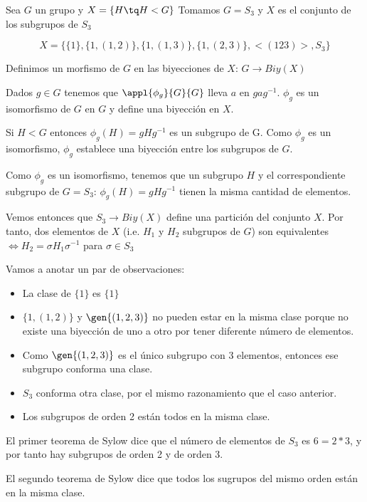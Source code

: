 \documentclass[nochap]{apuntes}
\begin{document}
 \begin{example}
Sea $G$ un grupo y $X = \{ H\tq H<G\} $
Tomamos $G = S_3$ y $X$ es el conjunto de los subgrupos de $S_3$

\[ X = \{ \{1 \}, \{1, (1,2) \}, \{1, (1,3) \}, \{1, (2,3) \}, <(123)>, S_3 \} \]

Definimos un morfismo de $G$ en las biyecciones de $X$: $G\longrightarrow Biy(X)$

Dados $g\in G$ tenemos que $\appl{\phi_g}{G}{G}$ lleva $a$ en $gag^{-1}$. $\phi _g$ es un isomorfismo de $G$ en $G$ y define una biyección en $X$.

Si $H<G$ entonces $\phi _g(H) = gHg^{-1}$ es un subgrupo de G. Como $\phi_g$ es un isomorfismo, $\phi_g$ establece una biyección entre los subgrupos de $G$.

Como $\phi _g$ es un isomorfismo, tenemos que un subgrupo $H$ y el correspondiente subgrupo de $G=S_3$: $\phi _g(H) = gHg^{-1}$ tienen la misma cantidad de elementos.

Vemos entonces que $S_3 \longrightarrow Biy(X)$ define una partición del conjunto $X$.
Por tanto, dos elementos de $X$ (i.e. $H_1$ y $H_2$ subgrupos de $G$) son equivalentes $\iff H_2 = \sigma H_1 \sigma^{-1}$ para $\sigma \in S_3$

Vamos a anotar un par de observaciones:\\
\begin{itemize}
\item La clase de $\{ 1\}$ es $\{ 1\}$
\item $\{ 1, (1,2)\}$ y $\gen{(1,2,3)}$ no pueden estar en la misma clase porque no existe una biyección de uno a otro por tener diferente número de elementos.
\item Como $\gen{(1,2,3)}$ es el único subgrupo con 3 elementos, entonces ese subgrupo conforma una clase.
\item $S_3$ conforma otra clase, por el mismo razonamiento que el caso anterior.
\item Los subgrupos de orden 2 están todos en la misma clase.
\end{itemize}

El primer teorema de Sylow dice que el número de elementos de $S_3$ es $6=2*3$, y por tanto hay subgrupos de orden 2 y de orden 3.

El segundo teorema de Sylow dice que todos los sugrupos del mismo orden están en la misma clase.
\end{example}
\end{document}
